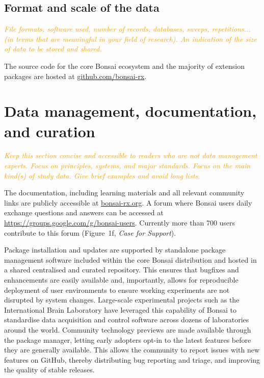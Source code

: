 \documentclass[a4paper,11pt]{article}
\begin{document}
\subsection{Format and scale of the data}

\textcolor{orange}{\textit{File formats, software used, number of records, databases, sweeps, repetitions... (in terms that are meaningful in your field of research). An indication of the size of data to be stored and shared.}}

The source code for the core Bonsai ecosystem and the majority of extension
packages are hosted at \url{github.com/bonsai-rx}.

\section{Data management, documentation, and curation}

\textcolor{orange}{\textit{Keep this section concise and accessible to readers who are not data management experts.  Focus on principles, systems, and major standards. Focus on the main kind(s) of study data.  Give brief examples and avoid long lists.}}

The documentation, including learning materials and all relevant community
links are publicly accessible at \url{bonsai-rx.org}. A forum where Bonsai
users daily exchange questions and answers can be accessed at
\url{https://groups.google.com/g/bonsai-users}. Currently more than 700 users
contribute to this forum (Figure~1f, \emph{Case for Support}).

Package installation and updates are supported by standalone package management
software included within the core Bonsai distribution and hosted in a shared
centralised and curated repository. This ensures that bugfixes and enhancements
are easily available and, importantly, allows for reproducible deployment of
user environments to ensure working experiments are not disrupted by system
changes.
%
Large-scale experimental projects such as the International Brain Laboratory
have leveraged this capability of Bonsai to standardise data acquisition and
control software across dozens of laboratories around the world.
%
Community technology previews are made available through the package manager,
letting early adopters opt-in to the latest features before they are generally
available. This allows the community to report issues with new features on
GitHub, thereby distributing bug reporting and triage, and improving the
quality of stable releases.
\end{document}

